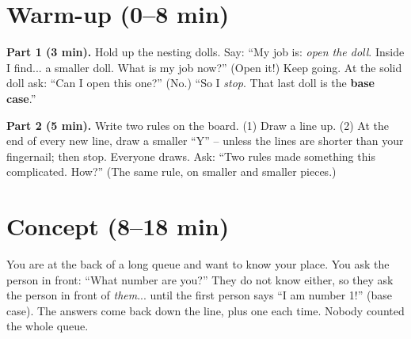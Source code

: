 \section{Warm-up (0--8 min)}
\begin{unplugged}
\textbf{Part 1 (3 min).} Hold up the nesting dolls. Say: \enquote{My job is: \emph{open the doll}. Inside I find... a smaller doll. What is my job now?} (Open it!) Keep going. At the solid doll ask: \enquote{Can I open this one?} (No.) \enquote{So I \emph{stop}. That last doll is the \textbf{base case}.}

\textbf{Part 2 (5 min).} Write two rules on the board. (1) Draw a line up. (2) At the end of every new line, draw a smaller \enquote{Y} -- unless the lines are shorter than your fingernail; then stop. Everyone draws. Ask: \enquote{Two rules made something this complicated. How?} (The same rule, on smaller and smaller pieces.)
\end{unplugged}

\section{Concept (8--18 min)}

\begin{analogy}
You are at the back of a long queue and want to know your place. You ask the person in front: \enquote{What number are you?} They do not know either, so they ask the person in front of \emph{them}... until the first person says \enquote{I am number 1!} (base case). The answers come back down the line, plus one each time. Nobody counted the whole queue.
\end{analogy}

